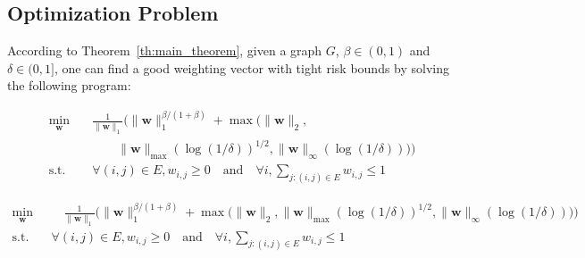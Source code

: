 \documentclass[letterpaper]{article} %
\def\DoubleColumn{}
\def\DoubleColumnEnd{}
\def\SingleColumn{}
\def\SingleColumnEnd{}
\newcommand{\weight}{\mathbf{w}}
\newcommand{\pair}[1]{(#1)}
\newcommand{\normo}[1]{\|#1\|_1}
\newcommand{\complexbound}{\beta}
\begin{document}
\subsection{Optimization Problem} %
\label{sub:optimization_problem}
According to Theorem~\ref{th:main_theorem}, given a graph $G$, $\complexbound\in (0,1)$ and $\delta\in(0,1]$, one can find a good weighting vector with tight risk bounds by solving the following program:
\DoubleColumn
\begin{equation}
    \label{eq:optimization_program}
\begin{aligned}
    \min_{\weight{}} \quad&\frac{1}{\normo{\weight{}}}\bigg(\normo{\weight{}}^{\complexbound/(1+\complexbound)}+\max\Big(\|\weight{}\|_2,\\
    &\qquad\|\weight{}\|_{\max}(\log(1/\delta))^{1/2},
    \|\weight{}\|_\infty(\log(1/\delta))\Big)\bigg)\\
    \mbox{s.t.} \quad& \forall \pair{i,j}\in E, w_{i,j}\ge 0 \quad \mbox{and} \quad  \forall i, \sum_{j:\pair{i,j}\in E} w_{i,j}\le 1
\end{aligned}
\end{equation}
\DoubleColumnEnd
\SingleColumn
\begin{equation}
    \label{eq:optimization_program}
\begin{aligned}
    \min_{\weight{}} & \quad\frac{1}{\normo{\weight{}}}\bigg(\normo{\weight{}}^{\complexbound{}/(1+\complexbound{})}+\max\Big(\|\weight{}\|_2,\|\weight{}\|_{\max}(\log(1/\delta))^{1/2},\|\weight{}\|_\infty(\log(1/\delta))\Big)\bigg)\\
    \mbox{s.t.} \quad& \forall \pair{i,j}\in E, w_{i,j}\ge 0 \quad \mbox{and} \quad  \forall i, \sum_{j:\pair{i,j}\in E} w_{i,j}\le 1
\end{aligned}
\end{equation}
\SingleColumnEnd
\end{document}
